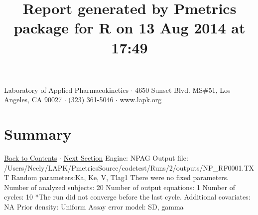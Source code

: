 \documentclass{article}
\title{Report generated by Pmetrics package for R on 13 Aug 2014 at 17:49 }
\date{}
\begin{document}
              \maketitle 
Laboratory of Applied Pharmacokinetics $\cdot$ 4650 Sunset Blvd. MS\#51, Los Angeles, CA 90027 $\cdot$ (323) 361-5046 $\cdot$ \href{http://www.lapk.org}{www.lapk.org} 
\hypertarget{tableofcontents}{}
        \tableofcontents
        \newpage 
\section{Summary} \hyperlink{tableofcontents}{Back to Contents} $\cdot$ \hyperlink{cycleinfo}{Next Section}\newline
 \newline 
Engine: NPAG\newline 
Output file: /Users/Neely/LAPK/PmetricsSource/codetest/Runs/2/outputs/NP\_RF0001.TXT\newline 
Random parameters:Ka, Ke, V, Tlag1\newline 
There were no fixed parameters. \newline 
Number of analyzed subjects:  20 \newline 
Number of output equations:  1 \newline 
Number of cycles:  10     *The run did not converge before the last cycle. \newline 
Additional covariates:  NA \newline 
Prior density: Uniform \newline Assay error model: SD, gamma \newline  \newline 
\newpage
            \hypertarget{cycleinfo}{}
            
\end{document}
